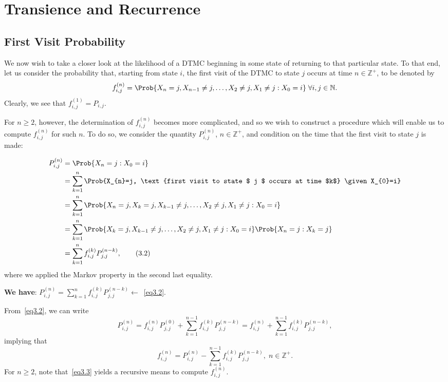 \section{Transience and Recurrence}
\subsection*{First Visit Probability}
\begin{Regular}
    We now wish to take a closer look at the likelihood of a DTMC beginning in some state of
    returning to that particular state. To that end, let us consider the probability that, starting
    from state $i$, the first visit of the DTMC to state $j$ occurs at time $ n\in\mathbb{Z}^+ $, to be denoted by
    \[ f_{i,j}^{(n)}=\Prob{X_n=j,X_{n-1}\ne j,\ldots,X_2\ne j, X_1\ne j\given X_0=i}\;\forall i,j\in\mathbb{N}. \]
    Clearly, we see that $ f_{i,j}^{(1)}=P_{i,j} $.

    For $n \geq 2$, however, the determination of $f_{i, j}^{(n)}$ becomes more complicated,
    and so we wish to construct a procedure which will enable us to compute
    $f_{i, j}^{(n)}$ for such $n$. To do so, we consider the quantity $P_{i, j}^{(n)}$, $n \in \mathbb{Z}^{+}$,
    and condition on the time that the first visit to state $j$ is made:

    \begin{align*}
        P_{i, j}^{(n)}
         & =\Prob{X_{n}=j \given X_{0}=i}                                                                                                  \\
         & =\sum_{k=1}^{n} \Prob{X_{n}=j, \text{first visit to state $ j $ occurs at time $k$} \given X_{0}=i}                             \\
         & =\sum_{k=1}^{n} \Prob{X_{n}=j, X_{k}=j, X_{k-1} \neq j, \ldots, X_{2} \neq j, X_{1} \neq j \given X_{0}=i}                      \\
         & =\sum_{k=1}^{n} \Prob{X_{k}=j, X_{k-1} \neq j, \ldots, X_{2} \neq j, X_{1} \neq j \given X_{0}=i} \Prob{X_{n}=j \given X_{k}=j} \\
         & =\sum_{k=1}^{n} f_{i,j}^{(k)} P_{j,j}^{(n-k)}, \label{eq3.2}\tag*{(3.2)}
    \end{align*}
    where we applied the Markov property in the second last equality.

    \textbf{We have}: $ P_{i,j}^{(n)}=\sum_{k=1}^{n} f_{i,j}^{(k)}P_{j,j}^{(n-k)}\leftarrow $~\ref{eq3.2}.

    From~\ref{eq3.2}, we can write
    \[ P_{i,j}^{(n)}=f_{i,j}^{(n)}P_{j,j}^{(0)}+\sum_{k=1}^{n-1} f_{i,j}^{(k)}P_{j,j}^{(n-k)}=f_{i,j}^{(n)}+\sum_{k=1}^{n-1}f_{i,j}^{(k)}P_{j,j}^{(n-k)}, \]
    implying that
    \[ f_{i, j}^{(n)}=P_{i, j}^{(n)}-\sum_{k=1}^{n-1} f_{i, j}^{(k)} P_{j, j}^{(n-k)},\; n \in \mathbb{Z}^{+}. \label{eq3.3}\tag*{(3.3)} \]
    For $ n\ge 2 $, note that~\ref{eq3.3} yields a recursive means to compute $ f_{i,j}^{(n)} $.
\end{Regular}
